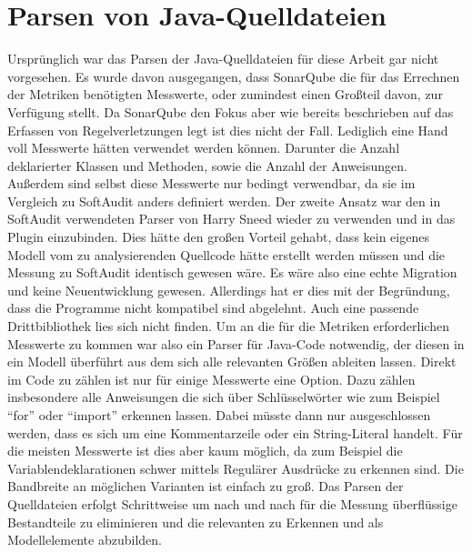 \documentclass[gb,ngerman]{stthesis}
\begin{document}
		\section{Parsen von Java-Quelldateien}
			Ursprünglich war das Parsen der Java-Quelldateien für diese Arbeit gar nicht vorgesehen. Es wurde davon ausgegangen, dass SonarQube die für das Errechnen der Metriken benötigten Messwerte, oder zumindest einen Großteil davon, zur Verfügung stellt. Da SonarQube den Fokus aber wie bereits beschrieben auf das Erfassen von Regelverletzungen legt ist dies nicht der Fall. Lediglich eine Hand voll Messwerte hätten verwendet werden können. Darunter die Anzahl deklarierter Klassen und Methoden, sowie die Anzahl der Anweisungen. Außerdem sind selbst diese Messwerte nur bedingt verwendbar, da sie im Vergleich zu SoftAudit anders definiert werden. \newline
			Der zweite Ansatz war den in SoftAudit verwendeten Parser von Harry Sneed wieder zu verwenden und in das Plugin einzubinden. Dies hätte den großen Vorteil gehabt, dass kein eigenes Modell vom zu analysierenden Quellcode hätte erstellt werden müssen und die Messung zu SoftAudit identisch gewesen wäre. Es wäre also eine echte Migration und keine Neuentwicklung gewesen. Allerdings hat er dies mit der Begründung, dass die Programme nicht kompatibel sind abgelehnt. Auch eine passende Drittbibliothek lies sich nicht finden. \newline
			Um an die für die Metriken erforderlichen Messwerte zu kommen war also ein Parser für Java-Code notwendig, der diesen in ein Modell überführt aus dem sich alle relevanten Größen ableiten lassen. Direkt im Code zu zählen ist nur für einige Messwerte eine Option. Dazu zählen insbesondere alle Anweisungen die sich über Schlüsselwörter wie zum Beispiel "`for"' oder "`import"' erkennen lassen. Dabei müsste dann nur ausgeschlossen werden, dass es sich um eine Kommentarzeile oder ein String-Literal handelt. Für die meisten Messwerte ist dies aber kaum möglich, da zum Beispiel die Variablendeklarationen schwer mittels Regulärer Ausdrücke zu erkennen sind. Die Bandbreite an möglichen Varianten ist einfach zu groß. \newline
			Das Parsen der Quelldateien erfolgt Schrittweise um nach und nach für die Messung überflüssige Bestandteile zu eliminieren und die relevanten zu Erkennen und als Modellelemente abzubilden. 
\end{document}
